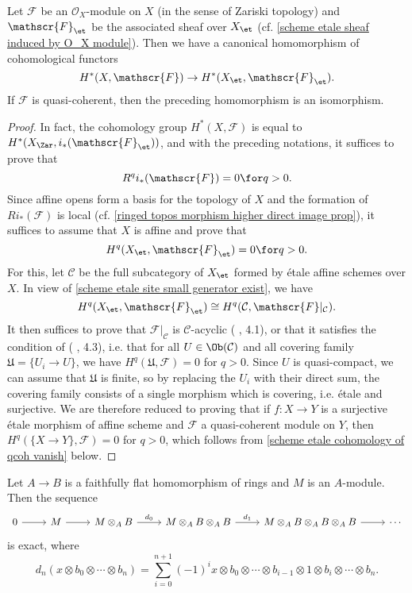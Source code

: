 \begin{proposition}\label{scheme cohomology X_et and X_Zar qcoh isomorphism}
Let $\mathscr{F}$ be an $\mathscr{O}_X$-module on $X$ (in the sense of Zariski topology) and $\mathscr{F}_\et$ be the associated sheaf over $X_\et$ (cf. \cref{scheme etale sheaf induced by O_X module}). Then we have a canonical homomorphism of cohomological functors
\begin{equation}\label{scheme cohomology X_et and X_Zar qcoh isomorphism-1}
H^*(X,\mathscr{F})\to H^*(X_\et,\mathscr{F}_\et).
\end{equation}
If $\mathscr{F}$ is quasi-coherent, then the preceding homomorphism is an isomorphism.
\end{proposition}
\begin{proof}
In fact, the cohomology group $H^*(X,\mathscr{F})$ is equal to $H^*(X_\Zar,i_*(\mathscr{F}_\et))$, and with the preceding notations, it suffices to prove that
\[R^qi_*(\mathscr{F})=0\for q>0.\]
Since affine opens form a basis for the topology of $X$ and the formation of $Ri_*(\mathscr{F})$ is local (cf. \cref{ringed topos morphism higher direct image prop}), it suffices to assume that $X$ is affine and prove that
\[H^q(X_\et,\mathscr{F}_\et)=0\for q>0.\]
For this, let $\mathcal{C}$ be the full subcategory of $X_\et$ formed by \'etale affine schemes over $X$. In view of \cref{scheme etale site small generator exist}, we have
\[H^q(X_\et,\mathscr{F}_\et)\cong H^q(\mathcal{C},\mathscr{F}|_\mathcal{C}).\]
It then suffices to prove that $\mathscr{F}|_\mathcal{C}$ is $\mathcal{C}$-acyclic (\cite{SGA4-1} , 4.1), or that it satisfies the condition of (\cite{SGA4-1} , 4.3), i.e. that for all $U\in\Ob(\mathcal{C})$ and all covering family $\mathfrak{U}=\{U_i\to U\}$, we have $H^q(\mathfrak{U},\mathscr{F})=0$ for $q>0$. Since $U$ is quasi-compact, we can assume that $\mathfrak{U}$ is finite, so by replacing the $U_i$ with their direct sum, the covering family consists of a single morphism which is covering, i.e. \'etale and surjective. We are therefore reduced to proving that if $f:X\to Y$ is a surjective \'etale morphism of affine scheme and $\mathscr{F}$ a quasi-coherent module on $Y$, then $H^q(\{X\to Y\},\mathscr{F})=0$ for $q>0$, which follows from \cref{scheme etale cohomology of qcoh vanish} below.
\end{proof}
\begin{lemma}\label{scheme etale cohomology of qcoh vanish}
Let $A\to B$ is a faithfully flat homomorphism of rings and $M$ is an $A$-module. Then the sequence
\[\begin{tikzcd}
0\ar[r]&M\ar[r]&M\otimes_AB\ar[r,"d_0"]&M\otimes_AB\otimes_AB\ar[r,"d_1"]&M\otimes_AB\otimes_AB\otimes_AB\ar[r]&\cdots
\end{tikzcd}\]
is exact, where
\[d_n(x\otimes b_0\otimes\cdots\otimes b_n)=\sum_{i=0}^{n+1}(-1)^ix\otimes b_0\otimes\cdots\otimes b_{i-1}\otimes 1\otimes b_i\otimes\cdots\otimes b_n.\]
\end{lemma}
